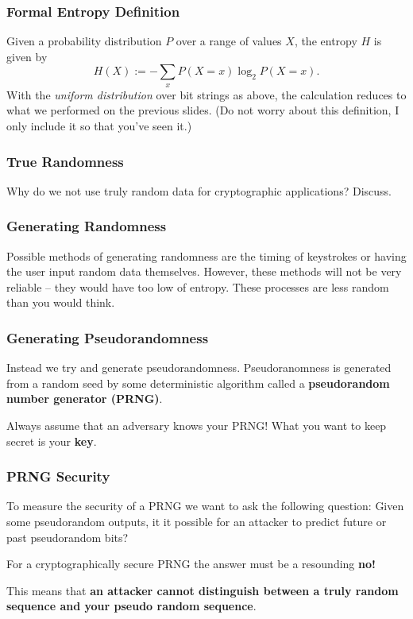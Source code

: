 \documentclass{beamer}
\newcommand{\<}{\langle}
\renewcommand{\>}{\rangle}
\begin{document}
\begin{frame}
\frametitle{Formal Entropy Definition}

Given a probability distribution $P$ over a range of values $X$, the entropy $H$ is given by
\[
H(X) := - \sum_{x} P(X = x) \log_2 P(X = x).
\]
With the \emph{uniform distribution} over bit strings as above, the calculation reduces to what we performed on the previous slides. (Do not worry about this definition, I only include it so that you've seen it.)
\end{frame}

\begin{frame}
\frametitle{True Randomness}

Why do we not use truly random data for cryptographic applications? Discuss.
\end{frame}

\begin{frame}
\frametitle{Generating Randomness}

Possible methods of generating randomness are the timing of keystrokes or having the user input random data themselves. However, these methods will not be very reliable -- they would have too low of entropy. These processes are less random than you would think.
\end{frame}

\begin{frame}
\frametitle{Generating Pseudorandomness}

Instead we try and generate pseudorandomness. Pseudoranomness is generated from a random seed by some deterministic algorithm called a \textbf{pseudorandom number generator (PRNG)}. \newline

Always assume that an adversary knows your PRNG! What you want to keep secret is your \textbf{key}.
\end{frame}

\begin{frame}
\frametitle{PRNG Security}

To measure the security of a PRNG we want to ask the following question: Given some pseudorandom outputs, it it possible for an attacker to predict future or past pseudorandom bits? \newline

For a cryptographically secure PRNG the answer must be a resounding \textbf{no!} \newline

This means that \textbf{an attacker cannot distinguish between a truly random sequence and your pseudo random sequence}.
\end{frame}
\end{document}
